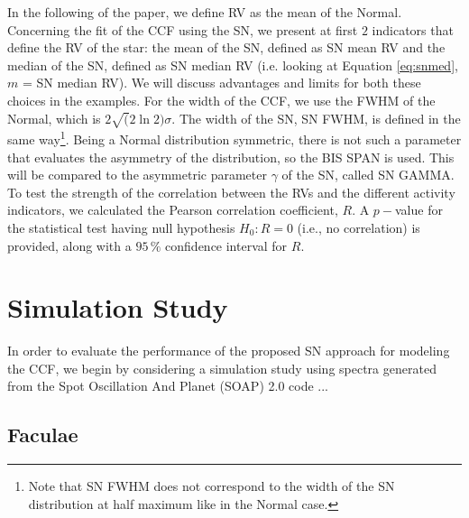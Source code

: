 \documentclass[11pt, oneside]{article}
\begin{document}
In the following of the paper, we define RV as the mean of the Normal. Concerning the fit of the CCF using the SN, we present at first $2$ indicators that define the RV of the star: the mean of the SN, defined as SN mean RV and the median of the SN, defined as SN median RV (i.e. looking at Equation \eqref{eq:snmed}, $m$ = SN median RV). We will discuss advantages and limits for both these choices in the examples. For the width of the CCF, we use the FWHM of the Normal, which is $2\sqrt(2\ln2)\sigma$. The width of the SN, SN FWHM, is defined in the same way\footnote{Note that SN FWHM does not correspond to the width of the SN distribution at half maximum like in the Normal case.}. Being a Normal distribution symmetric, there is not such a parameter that evaluates the asymmetry of the distribution, so the BIS SPAN is used. This will be compared to the asymmetric parameter $\gamma$ of the SN, called SN GAMMA. To test the strength of the correlation between the RVs and the different activity indicators, we calculated the Pearson correlation coefficient, $R$.
A $p-$value for the statistical test having null hypothesis $H_{0}: R=0$ (i.e., no correlation) is provided, along with a $95\,\%$ confidence interval for $R$.

\section{Simulation Study} \label{sec:soap}
In order to evaluate the performance of the proposed SN approach for modeling the CCF, we begin by considering a simulation study using spectra generated from the Spot Oscillation And Planet (SOAP) 2.0 code \citep{Dumusque-2014b}...

\subsection{Faculae} \label{sec:soap.faculae}
\end{document}
